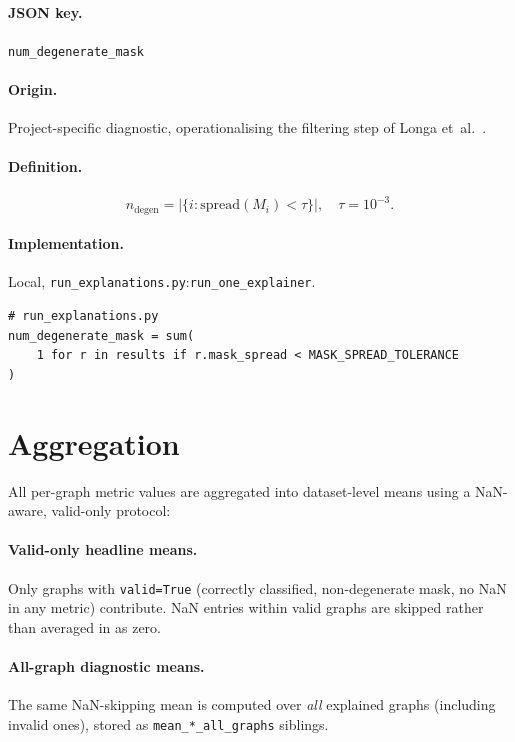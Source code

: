 \documentclass[11pt,a4paper]{article}
\newcommand{\code}[1]{\texttt{#1}}
\newcommand{\jsonkey}[1]{\texttt{#1}}
\begin{document}
\paragraph{JSON key.} \jsonkey{num\_degenerate\_mask}

\paragraph{Origin.} Project-specific diagnostic, operationalising the
filtering step of Longa et~al.~\cite{longa2025}.

\paragraph{Definition.}
\begin{equation}
  n_{\mathrm{degen}} = \bigl|\{i : \mathrm{spread}(M_i) < \tau\}\bigr|,
  \quad \tau = 10^{-3}.
  \label{eq:ndegen}
\end{equation}

\paragraph{Implementation.} Local,
\code{run\_explanations.py}:\code{run\_one\_explainer}.

\begin{verbatim}
# run_explanations.py
num_degenerate_mask = sum(
    1 for r in results if r.mask_spread < MASK_SPREAD_TOLERANCE
)
\end{verbatim}


\section{Aggregation}
\label{sec:aggregation}

All per-graph metric values are aggregated into dataset-level means using a
NaN-aware, valid-only protocol:

\paragraph{Valid-only headline means.}
Only graphs with \code{valid=True} (correctly classified, non-degenerate mask,
no NaN in any metric) contribute.  NaN entries within valid graphs are
skipped rather than averaged in as zero.

\paragraph{All-graph diagnostic means.}
The same NaN-skipping mean is computed over \emph{all} explained graphs
(including invalid ones), stored as \jsonkey{mean\_*\_all\_graphs} siblings.
\end{document}
